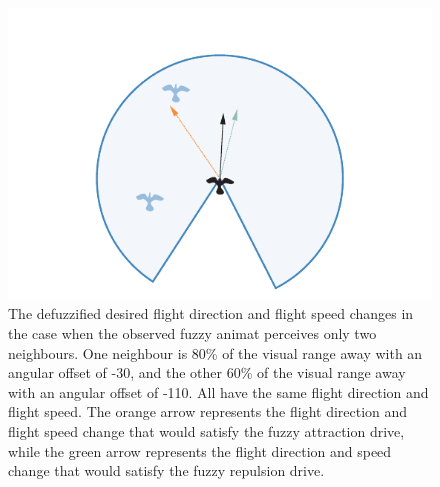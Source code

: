\begin{figure}%
\includegraphics{fig[attractionFLSout]}
\caption{The defuzzified desired flight direction and flight speed changes in the case when the observed fuzzy animat perceives only two neighbours. One neighbour is 80\% of the visual range away with an angular offset of -30\deg, and the other 60\% of the visual range away with an angular offset of -110\deg. All have the same flight direction and flight speed. The orange arrow represents the flight direction and flight speed change that would satisfy the fuzzy attraction drive, while the green arrow represents the flight direction and speed change that would satisfy the fuzzy repulsion drive.}
\label{fig:attraction:FLS:output}
\end{figure}
